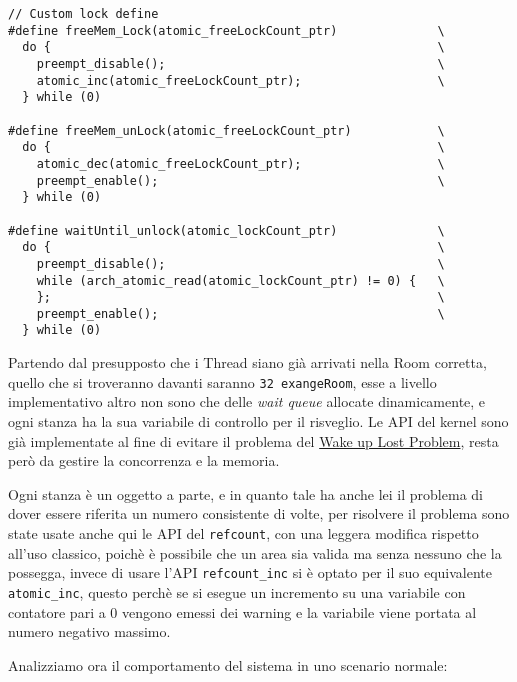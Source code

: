\begin{verbatim}
// Custom lock define
#define freeMem_Lock(atomic_freeLockCount_ptr)              \
  do {                                                      \
    preempt_disable();                                      \
    atomic_inc(atomic_freeLockCount_ptr);                   \
  } while (0)

#define freeMem_unLock(atomic_freeLockCount_ptr)            \
  do {                                                      \
    atomic_dec(atomic_freeLockCount_ptr);                   \
    preempt_enable();                                       \
  } while (0)

#define waitUntil_unlock(atomic_lockCount_ptr)              \
  do {                                                      \
    preempt_disable();                                      \
    while (arch_atomic_read(atomic_lockCount_ptr) != 0) {   \
    };                                                      \
    preempt_enable();                                       \
  } while (0)
\end{verbatim}


Partendo dal presupposto che i Thread siano già arrivati nella Room corretta, quello che si troveranno davanti saranno
\texttt{32 exangeRoom}, esse a livello implementativo altro non sono che delle \textit{wait queue} allocate
dinamicamente, e ogni stanza ha la sua variabile di controllo per il risveglio. Le API del kernel sono già implementate
al fine di evitare il problema del \underline{Wake up Lost Problem}, resta però da gestire la concorrenza e la memoria.

Ogni stanza è un oggetto a parte, e in quanto tale ha anche lei il problema di dover essere riferita un numero
consistente di volte, per risolvere il problema sono state usate anche qui le API del \texttt{refcount}, con una
leggera modifica rispetto all'uso classico, poichè è possibile che un area sia valida ma senza nessuno che la possegga,
invece di usare l'API \verb|refcount_inc| si è optato per il suo equivalente \verb|atomic_inc|, questo perchè se si
esegue un incremento su una variabile con contatore pari a 0 vengono emessi dei warning e la variabile viene portata al
numero negativo massimo.

Analizziamo ora il comportamento del sistema in uno scenario normale:


